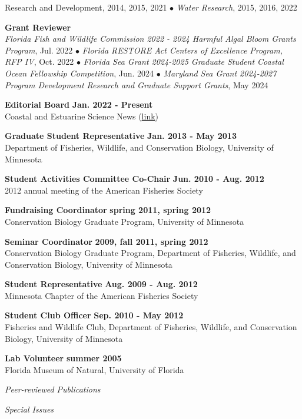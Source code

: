\documentclass[letterpaper,12pt]{article}
\newcommand{\sectitle}[1]{\vspace{\baselineskip} \centerline{\large{\textit{#1}}}}
\newcommand{\subsectitle}[1]{\vspace{\baselineskip} \centerline{\normalsize{\textit{#1}}}}
\begin{document}
Research and Development, 2014, 2015, 2021 $\bullet$ \textit{Water Research}, 2015, 2016, 2022

{\bf Grant Reviewer} \hfill \\
\textit{Florida Fish and Wildlife Commission 2022 - 2024 Harmful Algal Bloom Grants Program}, Jul. 2022 $\bullet$ \textit{Florida RESTORE Act Centers of Excellence Program, RFP IV}, Oct. 2022 $\bullet$ \textit{Florida Sea Grant 2024-2025 Graduate Student Coastal Ocean Fellowship Competition}, Jun. 2024 $\bullet$ \textit{Maryland Sea Grant 2024-2027 Program Development Research and Graduate Support Grants}, May 2024

{\bf Editorial Board} \hfill {\bf Jan. 2022 - Present} \\
Coastal and Estuarine Science News (\href{https://www.cerf.science/cesn}{link})

{\bf Graduate Student Representative} \hfill {\bf Jan. 2013 - May 2013} \\
Department of Fisheries, Wildlife, and Conservation Biology, University of Minnesota

{\bf Student Activities Committee Co-Chair} \hfill {\bf Jun. 2010 - Aug. 2012} \\
2012 annual meeting of the American Fisheries Society

{\bf Fundraising Coordinator} \hfill {\bf spring 2011, spring 2012} \\
Conservation Biology Graduate Program, University of Minnesota

{\bf Seminar Coordinator} \hfill {\bf 2009, fall 2011, spring 2012} \\
Conservation Biology Graduate Program, Department of Fisheries, Wildlife, and Conservation Biology, University of Minnesota

{\bf Student Representative} \hfill {\bf Aug. 2009 - Aug. 2012} \\
Minnesota Chapter of the American Fisheries Society

{\bf Student Club Officer} \hfill {\bf Sep. 2010 - May 2012} \\
Fisheries and Wildlife Club, Department of Fisheries, Wildlife, and Conservation Biology, University of Minnesota 

{\bf Lab Volunteer} \hfill {\bf summer 2005} \\
Florida Museum of Natural, University of Florida

\sectitle{Peer-reviewed Publications}

\subsectitle{Special Issues}
\end{document}
